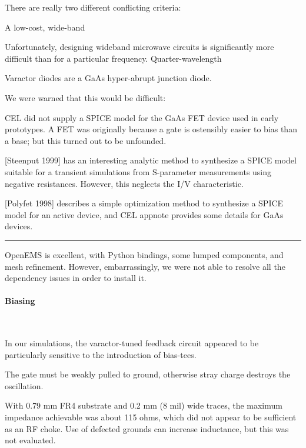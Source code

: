 \documentclass[paper.tex]{subfiles}
\begin{document}
There are really two different conflicting criteria: 

A low-cost, wide-band

Unfortunately, designing wideband microwave circuits is significantly more difficult than for a particular frequency. Quarter-wavelength 

Varactor diodes are a GaAs hyper-abrupt junction diode.

We were warned that this would be difficult: 



CEL did not supply a SPICE model for the GaAs FET device used in early prototypes. A FET was originally because a gate is ostensibly easier to bias than a base; but this turned out to be unfounded.

[Steenput 1999] has an interesting analytic method to synthesize a SPICE model suitable for a transient simulations from S-parameter measurements using negative resistances. However, this neglects the I/V characteristic. 

[Polyfet 1998] describes a simple optimization method to synthesize a SPICE model for an active device, and CEL appnote provides some details for GaAs devices.



\rule{\linewidth}{0.2pt}

OpenEMS is excellent, with Python bindings, some lumped components, and mesh refinement. However, embarrassingly, we were not able to resolve all the dependency issues in order to install it.





\paragraph{Biasing}\

In our simulations, the varactor-tuned feedback circuit appeared to be particularly sensitive to the introduction of bias-tees. 


The gate must be weakly pulled to ground, otherwise stray charge destroys the oscillation.




With 0.79 mm FR4 substrate and 0.2 mm (8 mil) wide traces, the maximum impedance achievable was about 115 ohms, which did not appear to be sufficient as an RF choke. Use of defected grounds can increase inductance, but this was not evaluated.
\end{document}
